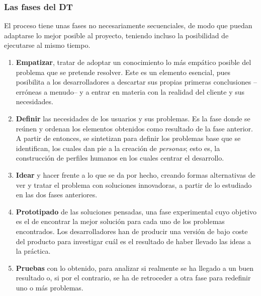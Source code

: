 \subsubsection{Las fases del DT}

El proceso tiene unas fases no necesariamente secuenciales, de modo que puedan adaptarse lo mejor posible al proyecto, teniendo incluso la posibilidad de ejecutarse al mismo tiempo.

\begin{enumerate}
	\item \textbf{Empatizar}, tratar de adoptar un conocimiento lo más empático posible del problema que se pretende resolver. Este es un elemento esencial, pues posibilita a los desarrolladores a descartar sus propias primeras conclusiones --erróneas a menudo-- y a entrar en materia con la realidad del cliente y sus necesidades.
	
	\item \textbf{Definir} las necesidades de los usuarios y sus problemas. Es la fase donde se reúnen y ordenan los elementos obtenidos como resultado de la fase anterior. A partir de entonces, se sintetizan para definir los problemas base que se identifican, los cuales dan pie a la creación de \textit{personas}; esto es, la construcción de perfiles humanos en los cuales centrar el desarrollo.
	
	\item \textbf{Idear} y hacer frente a lo que se da por hecho, creando formas alternativas de ver y tratar el problema con soluciones innovadoras, a partir de lo estudiado en las dos fases anteriores.
	
	\item \textbf{Prototipado} de las soluciones pensadas, una fase experimental cuyo objetivo es el de encontrar la mejor solución para cada uno de los problemas encontrados. Los desarrolladores han de producir una versión de bajo coste del producto para investigar cuál es el resultado de haber llevado las ideas a la práctica.
	
	\item \textbf{Pruebas} con lo obtenido, para analizar si realmente se ha llegado a un buen resultado o, si por el contrario, se ha de retroceder a otra fase para redefinir uno o más problemas.
	
\end{enumerate}

